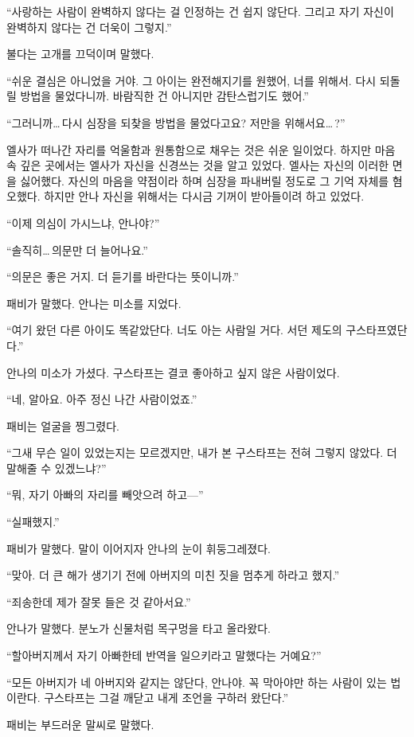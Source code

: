 ``사랑하는 사람이 완벽하지 않다는 걸 인정하는 건 쉽지 않단다. 그리고 자기 자신이 완벽하지 않다는 건 더욱이 그렇지.''

불다는 고개를 끄덕이며 말했다.

``쉬운 결심은 아니었을 거야. 그 아이는 완전해지기를 원했어, 너를 위해서. 다시 되돌릴 방법을 물었다니까. 바람직한 건 아니지만 감탄스럽기도 했어.''

``그러니까\ldots\,다시 심장을 되찾을 방법을 물었다고요? 저만을 위해서요\ldots\,?''

엘사가 떠나간 자리를 억울함과 원통함으로 채우는 것은 쉬운 일이었다. 하지만 마음 속 깊은 곳에서는 엘사가 자신을 신경쓰는 것을 알고 있었다. 엘사는 자신의 이러한 면을 싫어했다. 자신의 마음을 약점이라 하며 심장을 파내버릴 정도로 그 기억 자체를 혐오했다. 하지만 안나 자신을 위해서는 다시금 기꺼이 받아들이려 하고 있었다.

``이제 의심이 가시느냐, 안나야?''

``솔직히\ldots\,의문만 더 늘어나요.''

``의문은 좋은 거지. 더 듣기를 바란다는 뜻이니까.''

패비가 말했다. 안나는 미소를 지었다.

``여기 왔던 다른 아이도 똑같았단다. 너도 아는 사람일 거다. 서던 제도의 구스타프였단다.''

안나의 미소가 가셨다. 구스타프는 결코 좋아하고 싶지 않은 사람이었다.

``네, 알아요. 아주 정신 나간 사람이었죠.''

패비는 얼굴을 찡그렸다.

``그새 무슨 일이 있었는지는 모르겠지만, 내가 본 구스타프는 전혀 그렇지 않았다. 더 말해줄 수 있겠느냐?''

``뭐, 자기 아빠의 자리를 빼앗으려 하고—''

``실패했지.''

패비가 말했다. 말이 이어지자 안나의 눈이 휘둥그레졌다.

``맞아. 더 큰 해가 생기기 전에 아버지의 미친 짓을 멈추게 하라고 했지.''

``죄송한데 제가 잘못 들은 것 같아서요.''

안나가 말했다. 분노가 신물처럼 목구멍을 타고 올라왔다.

``할아버지께서 자기 아빠한테 반역을 일으키라고 말했다는 거예요?''

``모든 아버지가 네 아버지와 같지는 않단다, 안나야. 꼭 막아야만 하는 사람이 있는 법이란다. 구스타프는 그걸 깨닫고 내게 조언을 구하러 왔단다.''

패비는 부드러운 말씨로 말했다.

